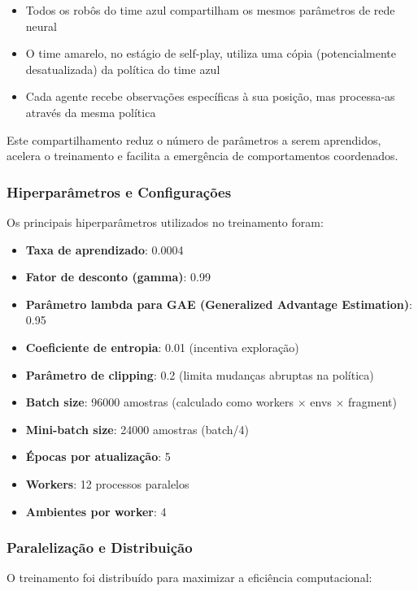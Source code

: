 \begin{itemize}
    \item Todos os robôs do time azul compartilham os mesmos parâmetros de rede neural
    \item O time amarelo, no estágio de self-play, utiliza uma cópia (potencialmente desatualizada) da política do time azul
    \item Cada agente recebe observações específicas à sua posição, mas processa-as através da mesma política
\end{itemize}

Este compartilhamento reduz o número de parâmetros a serem aprendidos, acelera o treinamento e facilita a emergência de comportamentos coordenados.

\subsubsection{Hiperparâmetros e Configurações}

Os principais hiperparâmetros utilizados no treinamento foram:

\begin{itemize}
    \item \textbf{Taxa de aprendizado}: 0.0004
    \item \textbf{Fator de desconto (gamma)}: 0.99
    \item \textbf{Parâmetro lambda para GAE (Generalized Advantage Estimation)}: 0.95
    \item \textbf{Coeficiente de entropia}: 0.01 (incentiva exploração)
    \item \textbf{Parâmetro de clipping}: 0.2 (limita mudanças abruptas na política)
    \item \textbf{Batch size}: 96000 amostras (calculado como workers × envs × fragment)
    \item \textbf{Mini-batch size}: 24000 amostras (batch/4)
    \item \textbf{Épocas por atualização}: 5
    \item \textbf{Workers}: 12 processos paralelos
    \item \textbf{Ambientes por worker}: 4
\end{itemize}

\subsubsection{Paralelização e Distribuição}

O treinamento foi distribuído para maximizar a eficiência computacional:

